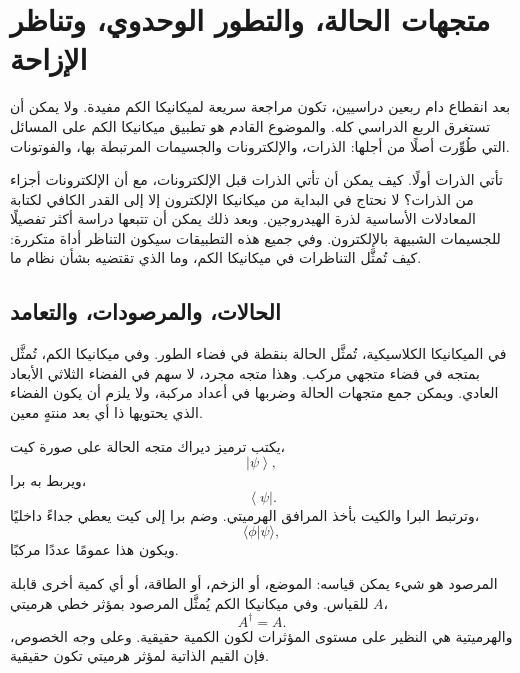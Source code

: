 \chapter{متجهات الحالة، والتطور الوحدوي، وتناظر الإزاحة}
\providecommand{\ket}[1]{\left\lvert#1\right\rangle}
\providecommand{\bra}[1]{\left\langle#1\right\rvert}

بعد انقطاع دام ربعين دراسيين، تكون مراجعة سريعة لميكانيكا الكم مفيدة. ولا يمكن أن تستغرق الربع الدراسي كله. والموضوع القادم هو تطبيق ميكانيكا الكم على المسائل التي طُوِّرت أصلًا من أجلها: الذرات، والإلكترونات والجسيمات المرتبطة بها، والفوتونات.

تأتي الذرات أولًا. كيف يمكن أن تأتي الذرات قبل الإلكترونات، مع أن الإلكترونات أجزاء من الذرات؟ لا نحتاج في البداية من ميكانيكا الإلكترون إلا إلى القدر الكافي لكتابة المعادلات الأساسية لذرة الهيدروجين. وبعد ذلك يمكن أن تتبعها دراسة أكثر تفصيلًا للجسيمات الشبيهة بالإلكترون. وفي جميع هذه التطبيقات سيكون التناظر أداة متكررة: كيف تُمثَّل التناظرات في ميكانيكا الكم، وما الذي تقتضيه بشأن نظام ما.

\section{الحالات، والمرصودات، والتعامد}

في الميكانيكا الكلاسيكية، تُمثَّل الحالة بنقطة في فضاء الطور. وفي ميكانيكا الكم، تُمثَّل بمتجه في فضاء متجهي مركب. وهذا متجه مجرد، لا سهم في الفضاء الثلاثي الأبعاد العادي. ويمكن جمع متجهات الحالة وضربها في أعداد مركبة، ولا يلزم أن يكون الفضاء الذي يحتويها ذا أي بعد منتهٍ معين.

يكتب ترميز ديراك متجه الحالة على صورة كيت،
\begin{equation}
\ket{\psi},
\end{equation}
ويربط به برا،
\begin{equation}
\bra{\psi}.
\end{equation}
وترتبط البرا والكيت بأخذ المرافق الهرميتي. وضم برا إلى كيت يعطي جداءً داخليًا،
\begin{equation}
\langle\phi|\psi\rangle,
\end{equation}
ويكون هذا عمومًا عددًا مركبًا.

المرصود هو شيء يمكن قياسه: الموضع، أو الزخم، أو الطاقة، أو أي كمية أخرى قابلة للقياس. وفي ميكانيكا الكم يُمثَّل المرصود بمؤثر خطي هرميتي \(A\)،
\begin{equation}
A^\dagger=A.
\end{equation}
والهرميتية هي النظير على مستوى المؤثرات لكون الكمية حقيقية. وعلى وجه الخصوص، فإن القيم الذاتية لمؤثر هرميتي تكون حقيقية.

